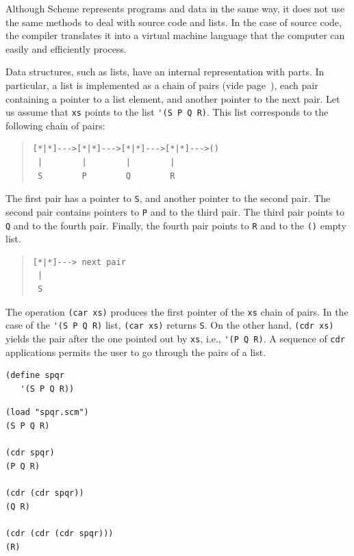\documentclass[a4paper,12pt]{book}
\newenvironment{fmpage}[1]
               {\begin{lrbox}{\fmbox}\begin{minipage}{#1}}
               {\end{minipage}\end{lrbox}\fbox{\usebox{\fmbox}}}
\begin{document}
Although Scheme represents programs and
data in the same way, it does not use
the same methods to deal with source
code and lists. In the case of source
code, the compiler translates it into
a virtual machine language that the
computer can easily and efficiently
process.

Data structures, such as lists, have
an internal representation with parts. 
In particular, a list is implemented
as a chain of pairs 
(vide page~\pageref{page:cartesian-pair}),
 each pair containing
a pointer to a list element,
and another pointer to the next pair. 
Let us assume that
\verb|xs| points to the list
\verb|'(S P Q R)|.
This list corresponds to the following
chain of pairs:
\begin{quote}
\begin{verbatim}
[*|*]--->[*|*]--->[*|*]--->[*|*]--->()
 |        |        |        |        
 S        P        Q        R       
\end{verbatim}
\end{quote}
The first pair has a pointer to \verb|S|,
and another pointer to the second pair.
The second pair contains pointers to 
\verb|P| and to the third pair. 
The third pair points to \verb|Q| and
to the fourth pair. Finally, the fourth
pair points to \verb|R| and to 
the \verb|()| empty list.

\begin{quote}
\begin{verbatim}
[*|*]---> next pair
 |        
 S      
\end{verbatim}
\end{quote}
The operation \verb|(car xs)| produces
the first pointer of the \verb|xs| 
chain of pairs. In the case of
the \verb|'(S P Q R)| list, \verb|(car xs)|
returns \verb|S|. On the other hand,
\verb|(cdr xs)| yields the pair
after the one pointed out by \verb|xs|,
i.e., \verb|'(P Q R)|. A sequence
of \verb|cdr| applications permits the user to
go through the pairs of a list. \\

\begin{fmpage}{0.8\linewidth}
\begin{verbatim}
(define spqr
   '(S P Q R))
\end{verbatim}
\end{fmpage}

\begin{fmpage}{0.8\linewidth}
\verb|(load "spqr.scm")|\keys{~]~}\\
\verb|(S P Q R)|\\
\verb||\\
\verb|(cdr spqr)|\\
\verb|(P Q R)|\\
\verb||\\
\verb|(cdr (cdr spqr))|\\
\verb|(Q R)|\\
\verb||\\
\verb|(cdr (cdr (cdr spqr)))|\\
\verb|(R)|
\end{fmpage}
\end{document}
